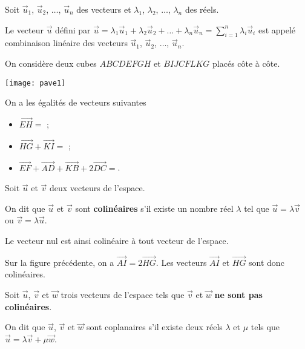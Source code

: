 \documentclass[11pt,fleqn, openany]{book} %
\begin{document}
\begin{definition} Soit $\vec u_1$, $ \vec u_2$, $\ldots$, $\vec u_n$ des vecteurs et $\lambda_1$, $\lambda_2$, $\ldots$, $\lambda_n$ des réels.

Le vecteur $\vec u$ défini par $\vec u = \lambda_1 \vec u_1 + \lambda_2 \vec u_2 + \ldots + \lambda_n \vec u_n = \displaystyle\sum_{i=1}^n \lambda_i \vec u_i$ est appelé combinaison linéaire des vecteurs $\vec u_1$, $\vec u_2$, $\ldots$, $\vec u_n$.\end{definition}
\begin{example}
On considère deux cubes $ABCDEFGH$ et $BIJCFLKG$ placés côte à côte.

\begin{minipage}{0.4\linewidth}
\texttt{[image: pave1]}

\end{minipage}\begin{minipage}{0.55 \linewidth}
 On a les égalités de vecteurs suivantes
\begin{itemize}
\item $\overrightarrow{EH} =$ ;
\item $\overrightarrow{HG}+\overrightarrow{KI}= $ ;
\item $\overrightarrow{EF}+\overrightarrow{AD}+\overrightarrow{KB}+2\overrightarrow{DC}=$.
\end{itemize}
\end{minipage}

\end{example}


\begin{definition}Soit $\vec u$ et $\vec v$ deux vecteurs de l'espace.

On dit que $\vec u$ et $\vec v$ sont \textbf{colinéaires} s'il existe un nombre réel $\lambda$ tel que $\vec u = \lambda \vec v$ ou $\vec v = \lambda \vec u$.\end{definition}

Le vecteur nul est ainsi colinéaire à tout vecteur de l'espace.

\begin{example}Sur la figure précédente, on a $\overrightarrow{AI}=2\overrightarrow{HG}$. Les vecteurs $\overrightarrow{AI}$ et $\overrightarrow{HG}$ sont donc colinéaires.\end{example}

\newpage

\begin{definition}Soit $\vec u$, $\vec v$ et $\vec w$ trois vecteurs de l'espace tels que $\vec v$ et $\vec w$ \textbf{ne sont pas colinéaires}. 

On dit que $\vec u$, $\vec v$ et $\vec w$ sont coplanaires s'il existe deux réels $\lambda$ et $\mu$ tels que $\vec u = \lambda \vec v+ \mu \vec w$.\end{definition}
\end{document}
